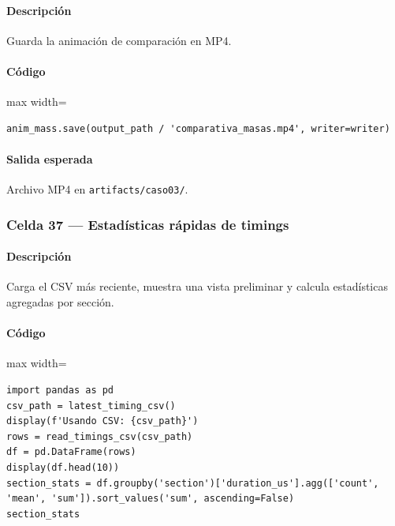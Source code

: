 \paragraph{Descripción} Guarda la animación de comparación en MP4.
\paragraph{Código}
\par\smallskip
\begin{listing}[H]
\caption{Celda 35: exportación de \texttt{comparativa\_masas.mp4}}
\begin{adjustbox}{max width=\textwidth}
\begin{minipage}{\textwidth}
\begin{verbatim}
anim_mass.save(output_path / 'comparativa_masas.mp4', writer=writer)
\end{verbatim}
\end{minipage}
\end{adjustbox}
\end{listing}
\paragraph{Salida esperada} Archivo MP4 en \texttt{artifacts/caso03/}.

\subsubsection*{Celda 37 — Estadísticas rápidas de timings}
\paragraph{Descripción} Carga el CSV más reciente, muestra una vista preliminar y calcula estadísticas agregadas por sección.
\paragraph{Código}
\par\smallskip
\begin{listing}[H]
\caption{Celda 37: inspección del CSV de timings}
\begin{adjustbox}{max width=\textwidth}
\begin{minipage}{\textwidth}
\begin{verbatim}
import pandas as pd
csv_path = latest_timing_csv()
display(f'Usando CSV: {csv_path}')
rows = read_timings_csv(csv_path)
df = pd.DataFrame(rows)
display(df.head(10))
section_stats = df.groupby('section')['duration_us'].agg(['count', 'mean', 'sum']).sort_values('sum', ascending=False)
section_stats
\end{verbatim}
\end{minipage}
\end{adjustbox}
\end{listing}
